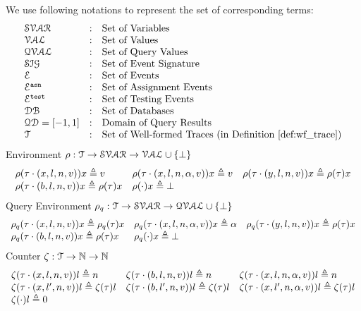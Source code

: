 We use following notations to represent the set of corresponding terms:
\[
\begin{array}{lll}
\mathcal{SVAR} & : & \mbox{Set of Variables}  
\\ 
%
\mathcal{VAL} & : & \mbox{Set of Values} 
\\ 
%
\mathcal{QVAL} & : & \mbox{Set of Query Values} 
\\ 
%
\mathcal{SIG} & : & \mbox{Set of Event Signature} 
\\ 
%
\eventset  & : & \mbox{Set of Events}  
\\
%
%
\eventset^{\asn}  & : & \mbox{Set of Assignment Events}  
\\
%
\eventset^{\test}  & : & \mbox{Set of Testing Events}  
\\
%
\dbdom  & : & \mbox{{Set of Databases}} 
\\
%
\qdom = {[-1,1]} & : & \mbox{{Domain of Query Results}}
\\
%
\mathcal{T} & : & \mbox{Set of Well-formed Traces (in Definition~\ref{def:wf_trace})}
\end{array}
\]
%
%
%
Environment $ \rho : \mathcal{T}  \to \mathcal{SVAR} \to \mathcal{VAL} \cup \{\bot\}$
\[
\begin{array}{lll}
\rho(\mathtt{\tau}  \cdot (x, l, n, v)) x \triangleq v
&
\rho(\mathtt{\tau} \cdot (x, l, n, \alpha, v)) x \triangleq v
&
\rho(\mathtt{\tau} \cdot (y, l, n, v)) x \triangleq \rho(\mathtt{\tau}) x
\\
\rho(\mathtt{\tau} \cdot (b, l, n, v)) x \triangleq \rho(\mathtt{\tau}) x
&
\rho(\cdot ) x \triangleq \bot
&
\end{array}
\]
%
%
Query Environment $\rho_{q}: \mathcal{T}  \to \mathcal{SVAR} \to \mathcal{QVAL} \cup \{\bot\}$
\[
\begin{array}{lll}
\rho_{q}(\mathtt{\tau} \cdot (x, l, n, v) ) x \triangleq \rho_{q}(\mathtt{\tau}) x
&
\rho_{q}(\mathtt{\tau} \cdot (x, l, n, \alpha, v) ) x \triangleq \alpha
&
\rho_{q}(\mathtt{\tau} \cdot (y, l, n, v)) x \triangleq \rho(\mathtt{\tau}) x
\\
\rho_{q}(\mathtt{\tau} \cdot (b, l, n, v)) x \triangleq \rho(\mathtt{\tau}) x
&
\rho_{q}(\cdot ) x \triangleq \bot
&
\end{array}
\]
%
Counter $\mathtt{\zeta} : \mathcal{T}  \to \mathbb{N} \to \mathbb{N}$
\[
\begin{array}{lll}
\mathtt{\zeta}(\mathtt{\tau} \cdot (x, l, n, v) ) l \triangleq n
&
\mathtt{\zeta}(\mathtt{\tau} \cdot (b, l, n, v)) l \triangleq n
&
\mathtt{\zeta}(\mathtt{\tau} \cdot (x, l, n, \alpha, v)) l \triangleq n
\\
\mathtt{\zeta}(\mathtt{\tau}  \cdot (x, l', n, v)) l \triangleq \mathtt{\zeta}(\mathtt{\tau} ) l
&
\mathtt{\zeta}(\mathtt{\tau} \cdot (b, l', n, v)) l \triangleq \mathtt{\zeta}(\mathtt{\tau} ) l
&
\mathtt{\zeta}(\mathtt{\tau} \cdot (x, l', n, \alpha, v)) l \triangleq \mathtt{\zeta}(\mathtt{\tau} ) l
\\
\mathtt{\zeta}(\cdot) l \triangleq 0
&&
\end{array}
\]
%
